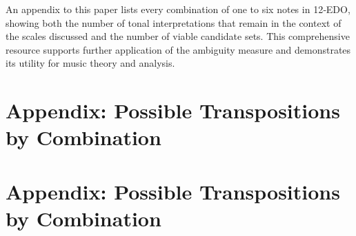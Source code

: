 \documentclass[10pt,twocolumn]{article}
\numberwithin{equation}{section} %
\begin{document}
    An appendix to this paper lists every combination of one to six notes in 12‑EDO, showing both the number of tonal interpretations that remain in the context of the scales discussed and the number of viable candidate sets.
    This comprehensive resource supports further application of the ambiguity measure and demonstrates its utility for music theory and analysis.

    \vfill\break
    
    

    \clearpage
    \appendix
    \section*{Appendix: Possible Transpositions by Combination}

    \newcommand{\sone}[1]{\cellcolor{gray!20}{#1}} %
    \newcommand{\diag}{\rowcolor{green!12}}        %

    \section*{Appendix: Possible Transpositions by Combination}

    \setlength{\tabcolsep}{3.5pt} %
    \small                         %

    \tablelasttail{\bottomrule}

    
\end{document}
